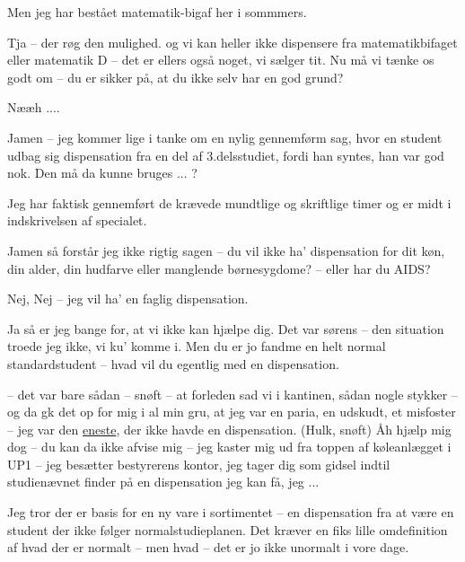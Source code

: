\documentclass[a4paper,11pt]{article}
\begin{document}
\begin{sketch}
 Men jeg har bestået matematik-bigaf her i sommmers.

 Tja -- der røg den mulighed. og vi kan heller ikke dispensere fra
matematikbifaget eller matematik D -- det er ellers også noget, vi sælger
tit. Nu må vi tænke os godt om -- du er sikker på, at du ikke selv har en god
grund?

 Nææh ....

 Jamen -- jeg kommer lige i tanke om en nylig gennemførm sag, hvor en
student udbag sig dispensation fra en del af 3.delsstudiet, fordi han syntes,
han var god nok. Den må da kunne bruges ... ?

 Jeg har faktisk gennemført de krævede mundtlige og skriftlige timer og
er midt i indskrivelsen af specialet.

 Jamen så forstår jeg ikke rigtig sagen -- du vil ikke ha' dispensation
for dit køn, din alder, din hudfarve eller manglende børnesygdome? -- eller har
du AIDS?

 Nej, Nej -- jeg vil ha' en faglig dispensation.

 Ja så er jeg bange for, at vi ikke kan hjælpe dig. Det var sørens --
den situation troede jeg ikke, vi ku' komme i. Men du er jo fandme en helt
normal standardstudent -- hvad vil du egentlig med en dispensation.

  -- det var bare sådan -- snøft -- at
forleden sad vi i kantinen, sådan nogle stykker -- og da gk det op for mig i al
min gru, at jeg var en paria, en udskudt, et misfoster -- jeg var den
\underline{eneste}, der ikke havde en dispensation. (Hulk, snøft) Åh hjælp mig
dog -- du kan da ikke afvise mig -- jeg kaster mig ud fra toppen af køleanlægget
i UP1 -- jeg besætter bestyrerens kontor, jeg tager dig som gidsel indtil
studienævnet finder på en dispensation jeg kan få, jeg ...


 Jeg tror der er basis for en ny vare i sortimentet -- en dispensation
fra at være en student der ikke følger normalstudieplanen. Det kræver en fiks
lille omdefinition af hvad der er normalt -- men hvad -- det er jo ikke unormalt
i vore dage.
\end{sketch}
\end{document}
